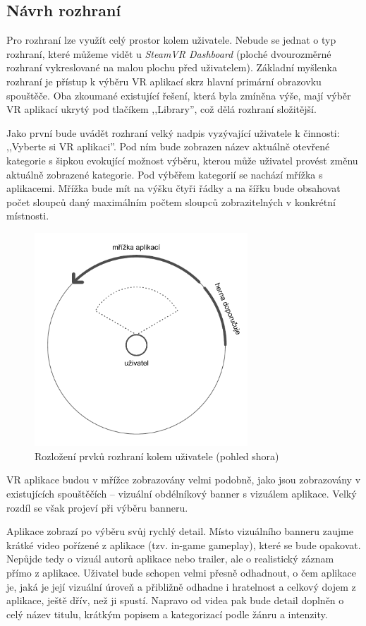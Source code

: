 \subsection{Návrh rozhraní}\label{nuxe1vrh-rozhranuxed}

Pro rozhraní lze využít celý prostor kolem uživatele. Nebude se jednat o
typ rozhraní, které můžeme vidět u \emph{SteamVR Dashboard} (ploché
dvourozměrné rozhraní vykreslované na malou plochu před uživatelem).
Základní myšlenka rozhraní je přístup k výběru VR aplikací skrz hlavní
primární obrazovku spouštěče. Oba zkoumané existující řešení, která byla
zmíněna výše, mají výběr VR aplikací ukrytý pod tlačíkem ,,Library'',
což dělá rozhraní složitější.

Jako první bude uvádět rozhraní velký nadpis vyzývající uživatele k
činnosti: ,,Vyberte si VR aplikaci''. Pod ním bude zobrazen název
aktuálně otevřené kategorie s šipkou evokující možnost výběru, kterou
může uživatel provést změnu aktuálně zobrazené kategorie. Pod výběřem
kategorií se nachází mřížka s aplikacemi. Mřížka bude mít na výšku čtyři
řádky a na šířku bude obsahovat počet sloupců daný maximálním
počtem sloupců zobrazitelných v konkrétní místnosti.

\begin{figure}[h!]
\centering
\includegraphics[height=8cm]{src/assets/wireframe-topdown-arrangement.pdf}
\caption{Rozložení prvků rozhraní kolem uživatele (pohled shora)}
\end{figure}

VR aplikace budou v mřížce zobrazovány velmi podobně, jako jsou
zobrazovány v existujících spouštěčích -- vizuální obdélníkový banner s
vizuálem aplikace. Velký rozdíl se však projeví při výběru banneru.

Aplikace zobrazí po výběru svůj rychlý detail. Místo vizuálního banneru zaujme
krátké video pořízené z aplikace (tzv. in-game gameplay), které se bude
opakovat. Nepůjde tedy o vizuál autorů aplikace nebo trailer, ale o
realistický záznam přímo z aplikace. Uživatel bude schopen velmi přesně
odhadnout, o čem aplikace je, jaká je její vizuální úroveň a přibližně
odhadne i hratelnost a celkový dojem z aplikace, ještě dřív, než ji
spustí. Napravo od videa pak bude detail doplněn o celý název titulu,
krátkým popisem a kategorizací podle žánru a intenzity. 

